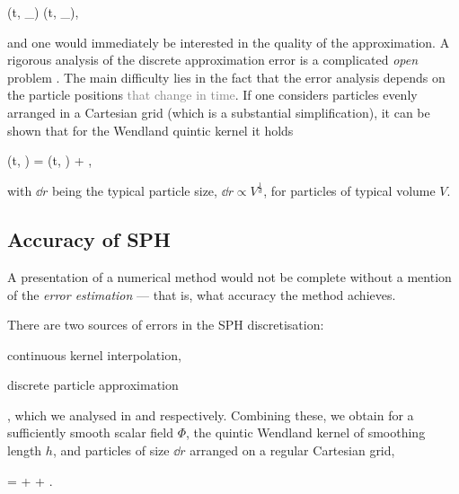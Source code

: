 \documentclass[../main.tex]{subfiles}
\begin{document}
\begin{equations}[single,*]
	\sphc{\Phi}\left(t, _{\alpha}\right) \approx \sphd{\Phi}\left(t, _{\alpha}\right),
\end{equations}

and one would immediately be interested in the quality of the approximation. A rigorous analysis of the discrete approximation error is a complicated \emph{open} problem \autocite[p.~3]{vacondioGrandChallengesSmoothed2021a}\autocite{quinlanTruncationErrorMeshfree2006}. The main difficulty lies in the fact that the error analysis depends on the particle positions \textcolor{gray}{that change in time}. 
If one considers particles evenly arranged in a Cartesian grid (which is a substantial simplification), it can be shown that for the Wendland quintic kernel it holds

\begin{equations}[single,!,numberline=all]
\label{eq:DIS-ERROR}
\sphd{\Phi}\left(t, \right) = \sphc{\Phi}\left(t, \right) + ,
\end{equations}
with $\dd{r}$ being the typical particle size, \ie $\dd{r} \propto V^{\frac{1}{d}}$, for particles of typical volume $V$.

\subsection{Accuracy of SPH}
\label{sec:ACCURACY}

A presentation of a numerical method would not be complete without a mention of the \emph{error estimation} --- that is, what accuracy the method achieves. 

There are two sources of errors in the SPH discretisation: \begin{inparaenum} \item continuous kernel interpolation, \item discrete particle approximation \end{inparaenum}, which we analysed in  and  respectively. Combining these, we obtain for a sufficiently smooth scalar field $\Phi$, the quintic Wendland kernel of smoothing length $h$, and particles of size $\dd{r}$ arranged on a regular Cartesian grid,

\begin{equations}[single,!,numberline=all]
\label{eq:ERR}
\sphd{\Phi} = \Phi +  + .
\end{equations}
\end{document}
